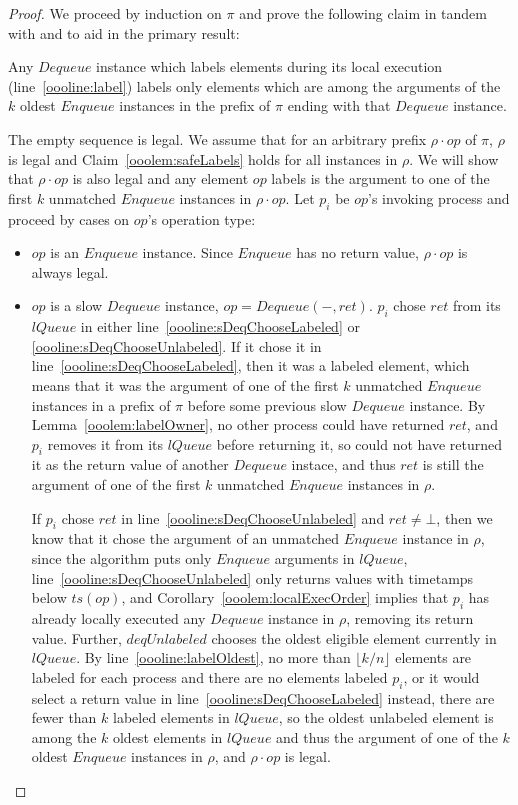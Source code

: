 \documentclass[a4paper,anonymous,USenglish]{lipics-v2021}
\theoremstyle{definition}
\begin{document}
\begin{proof}
  We proceed by induction on $\pi$ and prove the following claim in tandem with and to aid in the primary result:

  \begin{claim}\label{ooolem:safeLabels}
    Any $Dequeue$ instance which labels elements during its local execution (line~\ref{oooline:label}) labels only elements which are among the arguments of the $k$ oldest $Enqueue$ instances in the prefix of $\pi$ ending with that $Dequeue$ instance.
  \end{claim}

  The empty sequence is legal.  We assume that for an arbitrary prefix $\rho \cdot op$ of $\pi$, $\rho$ is legal and Claim~\ref{ooolem:safeLabels} holds for all instances in $\rho$.  We will show that $\rho \cdot op$ is also legal and any element $op$ labels is the argument to one of the first $k$ unmatched $Enqueue$ instances in $\rho \cdot op$.  Let $p_i$ be $op$'s invoking process and proceed by cases on $op$'s operation type:
  \begin{itemize}
  \item $op$ is an $Enqueue$ instance.  Since $Enqueue$ has no return value, $\rho \cdot op$ is always legal.
%
  \item $op$ is a slow $Dequeue$ instance, $op = Dequeue(-,ret)$.  $p_i$ chose $ret$ from its $lQueue$ in either line~\ref{oooline:sDeqChooseLabeled} or \ref{oooline:sDeqChooseUnlabeled}.  If it chose it in line~\ref{oooline:sDeqChooseLabeled}, then it was a labeled element, which means that it was the argument of one of the first $k$ unmatched $Enqueue$ instances in a prefix of $\pi$ before some previous slow $Dequeue$ instance.  By Lemma~\ref{ooolem:labelOwner}, no other process could have returned $ret$, and $p_i$ removes it from its $lQueue$ before returning it, so could not have returned it as the return value of another $Dequeue$ instace, and thus $ret$ is still the argument of one of the first $k$ unmatched $Enqueue$ instances in $\rho$.

    If $p_i$ chose $ret$ in line~\ref{oooline:sDeqChooseUnlabeled} and $ret \neq \bot$, then we know that it chose the argument of an unmatched $Enqueue$ instance in $\rho$, since the algorithm puts only $Enqueue$ arguments in $lQueue$, line~\ref{oooline:sDeqChooseUnlabeled} only returns values with timetamps below $ts(op)$, and Corollary~\ref{ooolem:localExecOrder} implies that $p_i$ has already locally executed any $Dequeue$ instance in $\rho$, removing its return value.  Further, $deqUnlabeled$ chooses the oldest eligible element currently in $lQueue$.  By line~\ref{oooline:labelOldest}, no more than $\lfloor k/n\rfloor$ elements are labeled for each process and there are no elements labeled $p_i$, or it would select a return value in line~\ref{oooline:sDeqChooseLabeled} instead, there are fewer than $k$ labeled elements in $lQueue$, so the oldest unlabeled element is among the $k$ oldest elements in $lQueue$ and thus the argument of one of the $k$ oldest $Enqueue$ instances in $\rho$, and $\rho \cdot op$ is legal.


\end{itemize}
\end{proof}
\end{document}
